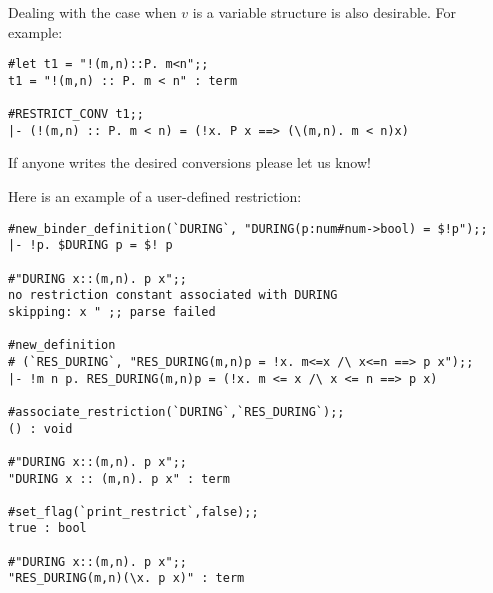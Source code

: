\begin{hol}
{\small\verb%   RES_FORALL %}$P${\small\verb% (\%}$v$\ml{.}$B$\ml{[}$v$\ml{])  ---->  !}$v$\ml{. }$P$ $v$\ml{ ==> }$B$\ml{[}$v$\ml{]}
\end{hol}

\noindent Dealing with the case when
$v$ is a variable structure is also desirable. For example:

\begin{session}\begin{verbatim}
#let t1 = "!(m,n)::P. m<n";;
t1 = "!(m,n) :: P. m < n" : term

#RESTRICT_CONV t1;;
|- (!(m,n) :: P. m < n) = (!x. P x ==> (\(m,n). m < n)x)

\end{verbatim}\end{session}

\noindent If anyone writes the desired conversions please let us know!

Here is an example of a user-defined restriction:

\begin{session}\begin{verbatim}
#new_binder_definition(`DURING`, "DURING(p:num#num->bool) = $!p");;
|- !p. $DURING p = $! p

#"DURING x::(m,n). p x";;
no restriction constant associated with DURING
skipping: x " ;; parse failed

#new_definition
# (`RES_DURING`, "RES_DURING(m,n)p = !x. m<=x /\ x<=n ==> p x");;
|- !m n p. RES_DURING(m,n)p = (!x. m <= x /\ x <= n ==> p x)

#associate_restriction(`DURING`,`RES_DURING`);;
() : void

#"DURING x::(m,n). p x";;
"DURING x :: (m,n). p x" : term

#set_flag(`print_restrict`,false);;
true : bool

#"DURING x::(m,n). p x";;
"RES_DURING(m,n)(\x. p x)" : term
\end{verbatim}\end{session}

